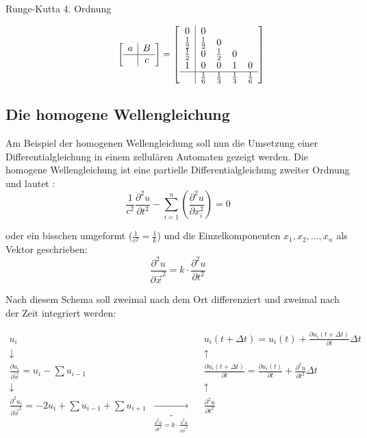 \documentclass[11pt]{article} %
\theoremstyle{definition}
\begin{document}
\begin{description}
\item[Runge-Kutta 4. Ordnung]
\[
\begin{bmatrix}
\begin{array}{c|c}
a & B\\
\hline     & c \\
\end{array}
\end{bmatrix} = \begin{bmatrix}
\begin{array}{c|cccc}
0 & 0 \\
\frac 1 2 & \frac 1 2 & 0 \\
\frac 1 2 & 0 & \frac 1 2 & 0 \\
1 & 0 & 0 & 1 & 0 \\\hline
& \frac 1 6 & \frac 1 3 & \frac 1 3 & \frac 1 6
\end{array}
\end{bmatrix}
\]
\end{description}

\subsection{Die homogene Wellengleichung}

Am Beispiel der homogenen Wellengleichung soll nun die Umsetzung einer Differentialgleichung in einem zellulären Automaten gezeigt werden. Die homogene Wellengleichung ist eine partielle Differentialgleichung zweiter Ordnung und lautet \cite{wiki:Wellengleichung}:
\[
\frac 1 {c^2} \frac{\partial^2 u}{\partial t^2}-\sum_{i=1}^{n} \left( \frac{\partial^2 u}{\partial x_i^2} \right)  = 0
\]

oder ein bisschen umgeformt ($\frac 1 {c^2} = \frac 1 k$) und die Einzelkomponenten $x_1, x_2, \dots, x_n$ als Vektor geschrieben:
\[
\frac {\partial^2 u} {\partial \vec x^2} = k \cdot \frac {\partial^2 u}{\partial t^2}
\]

Nach diesem Schema soll zweimal nach dem Ort differenziert und zweimal nach der Zeit integriert werden:

\begin{align*}
u_i &&& u_i(t+\Delta t) = u_i(t) +  \frac{\partial u_i(t+\Delta t)}{\partial t}\Delta t \\
\downarrow &&& \uparrow \\
\frac{\partial u_i}{\partial \vec x} = u_i - \sum u_{i-1} &&& \frac{\partial u_i(t+\Delta t)}{\partial t} = \frac{\partial u_i(t)}{\partial t} + \frac{\partial^2 u}{\partial t^2}\Delta t \\
\downarrow &&& \uparrow \\
\frac{\partial^2 u_i}{\partial \vec x^2} = -2u_i + \sum u_{i-1} + \sum u_{i+1} & \underbrace{\longrightarrow}_{\frac{\partial^2 u}{\partial t^2} = k\cdot \frac{\partial^2 u}{\partial \vec{x}^2}} && \frac{\partial^2 u}{\partial t^2}
\end{align*}
\end{document}
